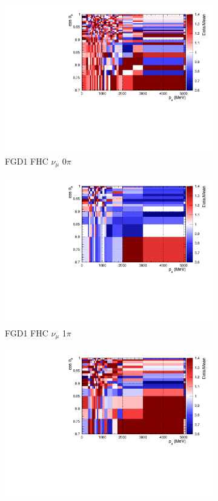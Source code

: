 \begin{figure}
\centering
\begin{subfigure}{.32\textwidth}
  \centering
  \includegraphics[width=0.85\linewidth]{figs/priorpred_FGD1_numuCC_0pi.pdf}
  \caption{FGD1 FHC $\nu_{\mu}$ 0$\pi$}
  \label{fig:priorpred_FGD1_numuCC_0pi}
\end{subfigure}
\begin{subfigure}{.32\textwidth}
  \centering
  \includegraphics[width=0.85\linewidth]{figs/priorpred_FGD1_numuCC_1pi.pdf}
  \caption{FGD1 FHC $\nu_{\mu}$ 1$\pi$}
  \label{fig:priorpred_FGD1_numuCC_1pi}
\end{subfigure}
\begin{subfigure}{.32\textwidth}
  \centering
  \includegraphics[width=0.85\linewidth]{figs/priorpred_FGD1_numuCC_other.pdf}

\end{subfigure}
\end{figure}

